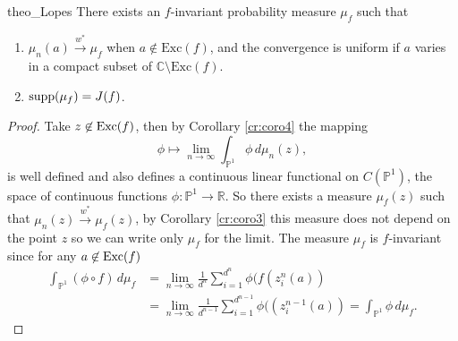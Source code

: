 \begin{mytheo}{}{theo_Lopes}
There exists an $f$-invariant probability measure $\mu_f$ such that
\begin{enumerate}
\item $ \mu_n(a) \overset{w^*}{\to} \mu_f$ when $a\not \in \text{Exc}(f)$, and the convergence is uniform if $a$ varies in a compact subset of $\mathbb{C} \setminus \text{Exc}(f)$.

\item $\text{supp}(\mu_f) = J(f)$.\\
\end{enumerate}
\end{mytheo}

\begin{proof}
Take $z\not \in \text{Exc}(f)$, then by Corollary \ref{cr:coro4} the mapping 
$$\phi \mapsto\lim_{n \rightarrow \infty} \int_{\mathbb{P}^1} \phi\, d\mu_n(z),$$
is well defined and also defines a continuous linear functional on $C(\mathbb{P}^1)$, the space of continuous functions $\phi:\mathbb{P}^1 \rightarrow \mathbb{R}$. So there exists a measure $\mu_f(z)$ such that $\mu_n(z) \overset{w^*}{\rightarrow} \mu_f(z)$, by Corollary \ref{cr:coro3} this measure does not depend on the point $z$ so we can write only $\mu_f$ for the limit. The measure $\mu_f$ is $f$-invariant since for any $a\not \in \text{Exc}(f)$
\begin{align*}
\int_{\mathbb{P}^1} (\phi\circ f) \,d\mu_f &= \lim_{n \rightarrow \infty} \frac{1}{d^n} \sum_{i=1}^{d^n}\phi(f(z_i^n(a))\\
& = \lim_{n \rightarrow \infty} \frac{1}{d^{n-1}} \sum_{i=1}^{d^{n-1}}\phi((z_i^{n-1}(a)) = \int_{\mathbb{P}^1}\phi \,d\mu_f.
\end{align*}


\end{proof}
